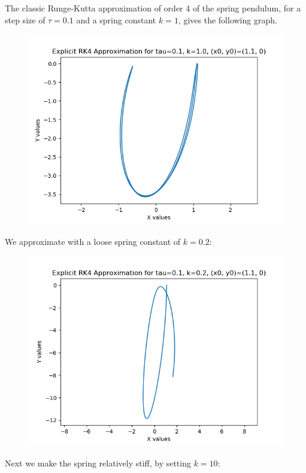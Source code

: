 \documentclass{article}
\theoremstyle{definition}
\begin{document}
\begin{itemize}
		The classic Runge-Kutta approximation of order 4 of the spring
		pendulum, for
		a step size of $\tau=0.1$ and a spring constant $k=1$, gives
		the following graph.
		\begin{figure}[H]
			\includegraphics[scale=0.6]{erk4_spring_01_1}
		\end{figure}
		We approximate with a loose spring constant of $k=0.2$:
		\begin{figure}[H]
			\includegraphics[scale=0.6]{erk4_spring_01_02}
		\end{figure}
		Next we make the spring relatively stiff, by setting $k=10$:
		\begin{figure}[H]

\end{figure}
\end{itemize}
\end{document}
